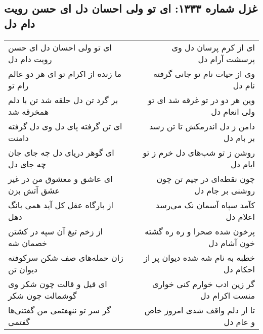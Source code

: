 \begin{center}
\section*{غزل شماره ۱۳۳۳: ای تو ولی احسان دل ای حسن رویت دام دل}
\label{sec:1333}
\begin{longtable}{l p{0.5cm} r}
ای تو ولی احسان دل ای حسن رویت دام دل
&&
ای از کرم پرسان دل وی پرسشت آرام دل
\\
ما زنده از اکرام تو ای هر دو عالم رام تو
&&
وی از حیات نام تو جانی گرفته نام دل
\\
بر گرد تن دل حلقه شد تن با دلم همخرقه شد
&&
وین هر دو در تو غرقه شد ای تو ولی انعام دل
\\
ای تن گرفته پای دل وی دل گرفته دامنت
&&
دامن ز دل اندرمکش تا تن رسد بر بام دل
\\
ای گوهر دریای دل چه جای جان چه جای دل
&&
روشن ز تو شب‌های دل خرم ز تو ایام دل
\\
ای عاشق و معشوق من در غیر عشق آتش بزن
&&
چون نقطه‌ای در جیم تن چون روشنی بر جام دل
\\
از بارگاه عقل کل آید همی بانگ دهل
&&
کآمد سپاه آسمان نک می‌رسد اعلام دل
\\
از زخم تیغ آن سپه در کشتن خصمان شه
&&
پرخون شده صحرا و ره ره گشته خون آشام دل
\\
زان حمله‌های صف شکن سرکوفته دیوان تن
&&
خطبه به نام شه شده دیوان پر از احکام دل
\\
ای قیل و قالت چون شکر وی گوشمالت چون شکر
&&
گر زین ادب خوارم کنی خواری منست اکرام دل
\\
گر سر تو ننهفتمی من گفتنی‌ها گفتمی
&&
تا از دلم واقف شدی امروز خاص و عام دل
\\
\end{longtable}
\end{center}
